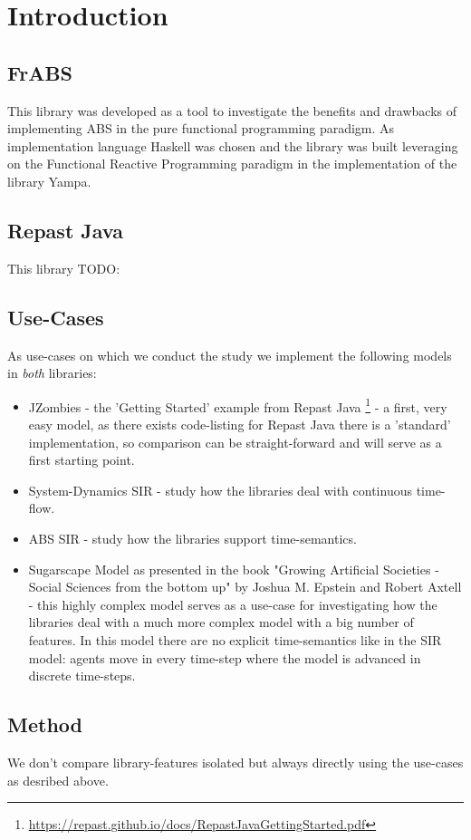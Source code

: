 \section{Introduction}

\subsection{FrABS}
This library was developed as a tool to investigate the benefits and drawbacks of implementing ABS in the pure functional programming paradigm. As implementation language Haskell was chosen and the library was built leveraging on the Functional Reactive Programming paradigm in the implementation of the library Yampa.

\subsection{Repast Java}
This library TODO:

\subsection{Use-Cases}
As use-cases on which we conduct the study we implement the following models in \textit{both} libraries:

\begin{itemize}
	\item JZombies - the 'Getting Started' example from Repast Java \footnote{\url{https://repast.github.io/docs/RepastJavaGettingStarted.pdf}} - a first, very easy model, as there exists code-listing for Repast Java there is a 'standard' implementation, so comparison can be straight-forward and will serve as a first starting point.
	
	\item System-Dynamics SIR - study how the libraries deal with continuous time-flow.
	
	\item ABS SIR - study how the libraries support time-semantics.
	
	\item Sugarscape Model as presented in the book "Growing Artificial Societies - Social Sciences from the bottom up" by Joshua M. Epstein and Robert Axtell \cite{epstein_growing_1996} - this highly complex model serves as a use-case for investigating how the libraries deal with a much more complex model with a big number of features. In this model there are no explicit time-semantics like in the SIR model: agents move in every time-step where the model is advanced in discrete time-steps.
\end{itemize}

\subsection{Method}
We don't compare library-features isolated but always directly using the use-cases as desribed above.